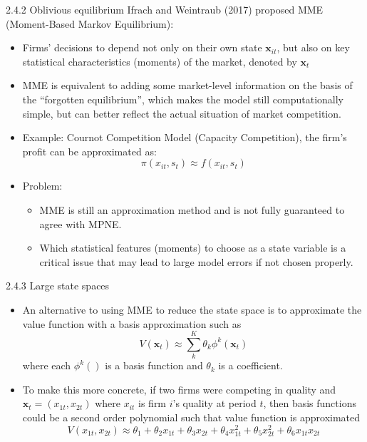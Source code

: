 \documentclass[aspectratio=169]{beamer}  %
\begin{document}
\begin{frame}
{2.4.2 Oblivious equilibrium}
Ifrach and Weintraub (2017) proposed MME (Moment-Based Markov Equilibrium):
\begin{itemize}
    \item Firms' decisions to depend not only on their own state $\mathbf{x}_{it}$, but also on key statistical characteristics (moments) of the market, denoted by $\mathbf{x}_{t}$
    \item MME is equivalent to adding some market-level information on the basis of the “forgotten equilibrium”, which makes the model still computationally simple, but can better reflect the actual situation of market competition.

    \item Example: Cournot Competition Model (Capacity Competition), the firm's profit can be approximated as:
    \[
    \pi(x_{it}, s_t) \approx f(x_{it}, s_t)
    \]
    \item Problem:
    \begin{itemize}
        \item MME is still an approximation method and is not fully guaranteed to agree with MPNE.
        \item Which statistical features (moments) to choose as a state variable is a critical issue that may lead to large model errors if not chosen properly.
    \end{itemize}
    
    
\end{itemize}
\end{frame}




\begin{frame}{2.4.3 Large state spaces}
\begin{itemize}
    \item An alternative to using MME to reduce the state space is to approximate the value function with a basis approximation such as 
    \[ 
    V(\mathbf{x}_t) \approx \sum_{k}^{K} \theta_k \phi^k(\mathbf{x}_t) 
    \] 
    where each \( \phi^k() \) is a basis function and \( \theta_k \) is a coefficient. 
    
    \item To make this more concrete, if two firms were competing in quality and \( \mathbf{x}_t = (x_{1t}, x_{2t}) \) where \( x_{it} \) is firm \( i \)'s quality at period \( t \), then basis functions could be a second order polynomial such that value function is approximated
    \[
    V(x_{1t}, x_{2t}) \approx \theta_1 + \theta_2 x_{1t} + \theta_3 x_{2t} + \theta_4 x_{1t}^2 + \theta_5 x_{2t}^2 + \theta_6 x_{1t} x_{2t} 
    \]
\end{itemize}
\end{frame}
\end{document}
